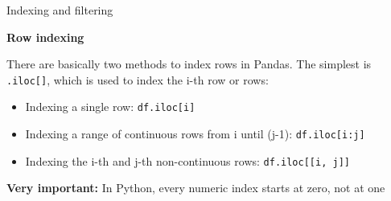 \documentclass[aspectratio=169]{beamer}
\begin{document}
\begin{frame}{Indexing and filtering}

	\textbf{Row indexing}

	There are basically two methods to index rows in Pandas. The simplest is \texttt{.iloc[]}, which is used to index the i-th row or rows:

	\begin{itemize}
		\item Indexing a single row: \texttt{df.iloc[i]}
		\item Indexing a range of continuous rows from i until (j-1): \texttt{df.iloc[i:j]}
		\item Indexing the i-th and j-th non-continuous rows: \texttt{df.iloc[[i, j]]}
	\end{itemize}

	\textbf{Very important:} In Python, every numeric index starts at zero, not at one

\end{frame}
\end{document}
